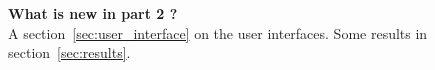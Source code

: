 \vspace*{5cm}

\begin{flushright}
  
  \textbf{What is new in part 2 ?}~\\
  
  A section~\ref{sec:user_interface} on the user interfaces.
  Some results in section~\ref{sec:results}.
  
\end{flushright}
